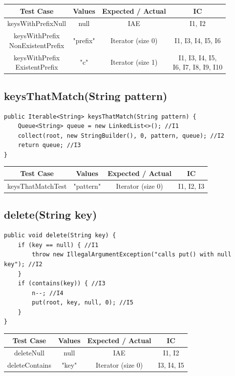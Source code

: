 \documentclass[12pt]{article}
\begin{document}
\begin{table}[htb]
\centering
\begin{tabular}{| c | c | c | c |} 
 \hline
 Test Case & Values & Expected / Actual & IC\\ \hline
 keysWithPrefixNull & null & IAE & I1, I2 \\ \hline
 \makecell{keysWithPrefix\\NonExistentPrefix} & "prefix" & Iterator (size 0) & I1, I3, I4, I5, I6 \\ \hline
 \makecell{keysWithPrefix\\ExistentPrefix} & "c" & Iterator (size 1) & \makecell{I1, I3, I4, I5, \\ I6, I7, I8, I9, I10} \\ \hline
\end{tabular}
\end{table}


\subsection{keysThatMatch(String pattern)}
\begin{lstlisting}
public Iterable<String> keysThatMatch(String pattern) {
    Queue<String> queue = new LinkedList<>(); //I1
    collect(root, new StringBuilder(), 0, pattern, queue); //I2
    return queue; //I3
}
\end{lstlisting}

\begin{table}[htb]
\centering
\begin{tabular}{| c | c | c | c |} 
 \hline
 Test Case & Values & Expected / Actual & IC\\ \hline
 keysThatMatchTest & "pattern" & Iterator (size 0) & I1, I2, I3 \\ \hline
\end{tabular}
\end{table}

\subsection{delete(String key)}
\begin{lstlisting}
public void delete(String key) {
    if (key == null) { //I1
        throw new IllegalArgumentException("calls put() with null key"); //I2
    }            
    if (contains(key)) { //I3
      	n--; //I4
    	put(root, key, null, 0); //I5
    }        
}
\end{lstlisting}

\begin{table}[htb]
\centering
\begin{tabular}{| c | c | c | c |} 
 \hline
 Test Case & Values & Expected / Actual & IC\\ \hline
 deleteNull & null & IAE & I1, I2 \\ \hline
 deleteContains & "key" & Iterator (size 0) & I3, I4, I5 \\ \hline
\end{tabular}
\end{table}
\end{document}
